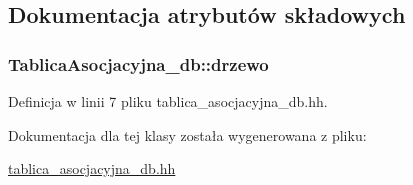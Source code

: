 \subsection{\-Dokumentacja atrybutów składowych}
\hypertarget{class_tablica_asocjacyjna__db_acbff6baa867f8ccd15b2106e0f557c95}{
\subsubsection[{drzewo}]{ {\bf \-Tablica\-Asocjacyjna\-\_\-db\-::drzewo}}}\label{class_tablica_asocjacyjna__db_acbff6baa867f8ccd15b2106e0f557c95}


\-Definicja w linii 7 pliku tablica\-\_\-asocjacyjna\-\_\-db.\-hh.



\-Dokumentacja dla tej klasy została wygenerowana z pliku\-:\begin{DoxyCompactItemize}
\item 
\hyperlink{tablica__asocjacyjna__db_8hh}{tablica\-\_\-asocjacyjna\-\_\-db.\-hh}\end{DoxyCompactItemize}
